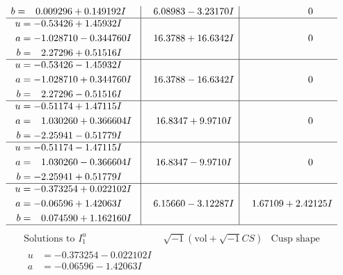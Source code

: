\documentclass[1p]{elsarticle_modified}
\theoremstyle{definition}
\newcommand{\I}{\sqrt{-1}}
\begin{document}
$$\begin{array}{c|c|c}
\begin{aligned}
b &= \phantom{-}0.009296 + 0.149192 I\end{aligned}
 & \phantom{-}6.08983 - 3.23170 I & \phantom{-0.000000 } 0 \\ \hline\begin{aligned}
u &= -0.53426 + 1.45932 I \\
a &= -1.028710 - 0.344760 I \\
b &= \phantom{-}2.27296 + 0.51516 I\end{aligned}
 & \phantom{-}16.3788 + 16.6342 I & \phantom{-0.000000 } 0 \\ \hline\begin{aligned}
u &= -0.53426 - 1.45932 I \\
a &= -1.028710 + 0.344760 I \\
b &= \phantom{-}2.27296 - 0.51516 I\end{aligned}
 & \phantom{-}16.3788 - 16.6342 I & \phantom{-0.000000 } 0 \\ \hline\begin{aligned}
u &= -0.51174 + 1.47115 I \\
a &= \phantom{-}1.030260 + 0.366604 I \\
b &= -2.25941 - 0.51779 I\end{aligned}
 & \phantom{-}16.8347 + 9.9710 I & \phantom{-0.000000 } 0 \\ \hline\begin{aligned}
u &= -0.51174 - 1.47115 I \\
a &= \phantom{-}1.030260 - 0.366604 I \\
b &= -2.25941 + 0.51779 I\end{aligned}
 & \phantom{-}16.8347 - 9.9710 I & \phantom{-0.000000 } 0 \\ \hline\begin{aligned}
u &= -0.373254 + 0.022102 I \\
a &= -0.06596 + 1.42063 I \\
b &= \phantom{-}0.074590 + 1.162160 I\end{aligned}
 & \phantom{-}6.15660 - 3.12287 I & \phantom{-}1.67109 + 2.42125 I\\
 \hline 
 \end{array}$$\newpage$$\begin{array}{c|c|c}  
\text{Solutions to }I^u_{1}& \I (\text{vol} + \sqrt{-1}CS) & \text{Cusp shape}\\
 \hline 
\begin{aligned}
u &= -0.373254 - 0.022102 I \\
a &= -0.06596 - 1.42063 I \\

\end{aligned}
\end{array}$$
\end{document}
